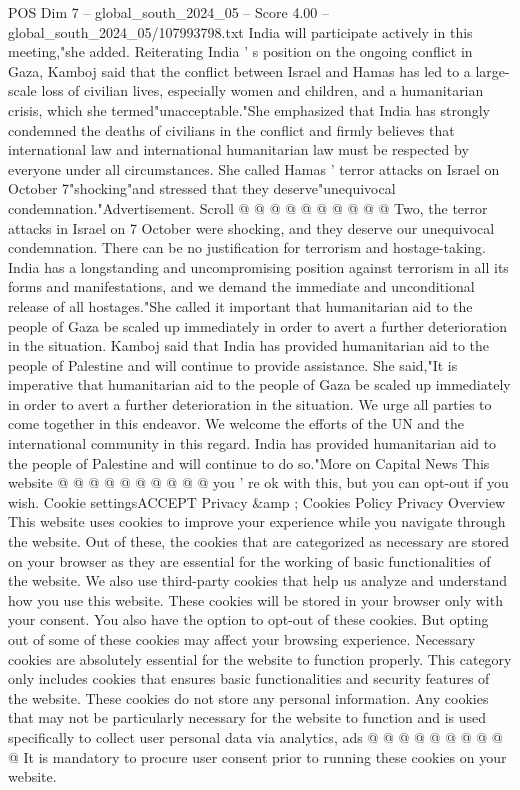 \begin{textsample}{POS Dim 7 – global\_south\_2024\_05 – Score 4.00 – global\_south\_2024\_05/107993798.txt}
India will participate actively in this meeting,"she added.
Reiterating India ' s position on the ongoing conflict in Gaza, Kamboj said that the conflict between Israel and Hamas has led to a large-scale loss of civilian lives, especially women and children, and a humanitarian crisis, which she termed"unacceptable."She emphasized that India has strongly condemned the deaths of civilians in the conflict and firmly believes that international law and international humanitarian law must be respected by everyone under all circumstances.
She called Hamas ' terror attacks on Israel on October 7"shocking"and stressed that they deserve"unequivocal condemnation."Advertisement.
Scroll @ @ @ @ @ @ @ @ @ @ Two, the terror attacks in Israel on 7 October were shocking, and they deserve our unequivocal condemnation.
There can be no justification for terrorism and hostage-taking.
India has a longstanding and uncompromising position against terrorism in all its forms and manifestations, and we demand the immediate and unconditional release of all hostages."She called it important that humanitarian aid to the people of Gaza be scaled up immediately in order to avert a further deterioration in the situation.
Kamboj said that India has provided humanitarian aid to the people of Palestine and will continue to provide assistance.
She said,"It is imperative that humanitarian aid to the people of Gaza be scaled up immediately in order to avert a further deterioration in the situation.
We urge all parties to come together in this endeavor.
We welcome the efforts of the UN and the international community in this regard.
India has provided humanitarian aid to the people of Palestine and will continue to do so."More on Capital News This website @ @ @ @ @ @ @ @ @ @ you ' re ok with this, but you can opt-out if you wish.
Cookie settingsACCEPT Privacy \&amp ; Cookies Policy Privacy Overview This website uses cookies to improve your experience while you navigate through the website.
Out of these, the cookies that are categorized as necessary are stored on your browser as they are essential for the working of basic functionalities of the website.
We also use third-party cookies that help us analyze and understand how you use this website.
These cookies will be stored in your browser only with your consent.
You also have the option to opt-out of these cookies.
But opting out of some of these cookies may affect your browsing experience.
Necessary cookies are absolutely essential for the website to function properly.
This category only includes cookies that ensures basic functionalities and security features of the website.
These cookies do not store any personal information.
Any cookies that may not be particularly necessary for the website to function and is used specifically to collect user personal data via analytics, ads @ @ @ @ @ @ @ @ @ @ It is mandatory to procure user consent prior to running these cookies on your website.

\end{textsample}
